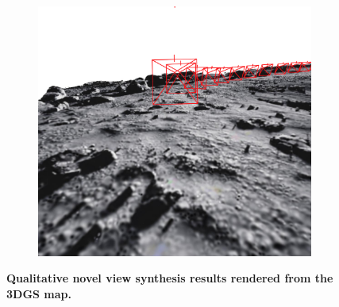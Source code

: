 \begin{figure}[t]
\begin{subfigure}[b]{0.3\linewidth}
	\end{subfigure}
	\hfill
	\begin{subfigure}[b]{0.3\linewidth}
		\includegraphics[width=\linewidth]{figures/3dgs/render-camera.png}
	\end{subfigure}
	\caption{\bfseries Qualitative novel view synthesis results rendered from the 3DGS map.}
	\label{fig:novel_views}
\end{figure}

